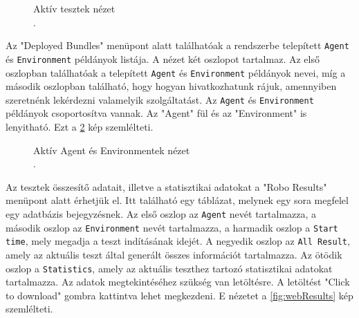 \begin{figure}[h!]
  \centering
  \caption[Aktív tesztek nézet]%
  {Aktív tesztek nézet\\
  {\white .}\hfill\url{}}
  \label{fig:webAktivTesztek}
\end{figure}


Az "Deployed Bundles" menüpont alatt találhatóak a rendszerbe telepített \texttt{Agent} és \texttt{Environment} példányok listája. A nézet két oszlopot tartalmaz. Az első oszlopban találhatóak a telepített \texttt{Agent} és \texttt{Environment} példányok nevei, míg a második oszlopban található, hogy hogyan hivatkozhatunk rájuk, amennyiben szeretnénk lekérdezni valamelyik szolgáltatást. Az \texttt{Agent} és \texttt{Environment} példányok csoportosítva vannak. Az "Agent" fül és az "Environment" is lenyitható. Ezt a \ref{fig:webAktivBatyuk} kép szemlélteti.

\begin{figure}[h!]
  \centering
  \caption[Aktív Agent és Environmentek nézet]%
  {Aktív Agent és Environmentek nézet\\
  {\white .}\hfill\url{}}
  \label{fig:webAktivBatyuk}
\end{figure}

Az tesztek összesítő adatait, illetve a statisztikai adatokat a "Robo Results" menüpont alatt érhetjük el. Itt található egy táblázat, melynek egy sora megfelel egy adatbázis bejegyzésnek. Az első oszlop az \texttt{Agent} nevét tartalmazza, a második oszlop az \texttt{Environment} nevét tartalmazza, a harmadik oszlop a \texttt{Start time}, mely megadja a teszt indításának idejét. A negyedik oszlop az \texttt{All Result}, amely az aktuális teszt által generált összes információt tartalmazza. Az ötödik oszlop a \texttt{Statistics}, amely az aktuális teszthez tartozó statisztikai adatokat tartalmazza. Az adatok megtekintéséhez szükség van letöltésre. A letöltést "Click to download" gombra kattintva lehet megkezdeni. E nézetet a \ref{fig:webResults} kép szemlélteti.


